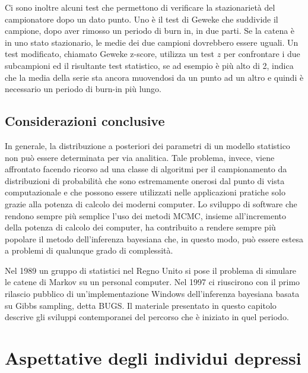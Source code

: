 \documentclass[
]{memoir}
\begin{document}
Ci sono inoltre alcuni test che permettono di verificare la stazionarietà del campionatore dopo un dato punto. Uno è il test di Geweke che suddivide il campione, dopo aver rimosso un periodo di burn in, in due parti. Se la catena è in uno stato stazionario, le medie dei due campioni dovrebbero essere uguali. Un test modificato, chiamato Geweke z-score, utilizza un test \(z\) per confrontare i due subcampioni ed il risultante test statistico, se ad esempio è più alto di 2, indica che la media della serie sta ancora muovendosi da un punto ad un altro e quindi è necessario un periodo di burn-in più lungo.

\hypertarget{considerazioni-conclusive}{%
\section*{Considerazioni conclusive}\label{considerazioni-conclusive}}

In generale, la distribuzione a posteriori dei parametri di un modello statistico non può essere determinata per via analitica. Tale problema, invece, viene affrontato facendo ricorso ad una classe di algoritmi per il campionamento da distribuzioni di probabilità che sono estremamente onerosi dal punto di vista computazionale e che possono essere utilizzati nelle applicazioni pratiche solo grazie alla potenza di calcolo dei moderni computer. Lo sviluppo di software che rendono sempre più semplice l'uso dei metodi MCMC, insieme all'incremento della potenza di calcolo dei computer, ha contribuito a rendere sempre più popolare il metodo dell'inferenza bayesiana che, in questo modo, può essere estesa a problemi di qualunque grado di complessità.

Nel 1989 un gruppo di statistici nel Regno Unito si pose il problema di simulare le catene di Markov su un personal computer. Nel 1997 ci riuscirono con il primo rilascio pubblico di un'implementazione Windows dell'inferenza bayesiana basata su Gibbs sampling, detta BUGS. Il materiale presentato in questo capitolo descrive gli sviluppi contemporanei del percorso che è iniziato in quel periodo.

\hypertarget{es-pratico-zetsche}{%
\chapter{Aspettative degli individui depressi}\label{es-pratico-zetsche}}
\end{document}
